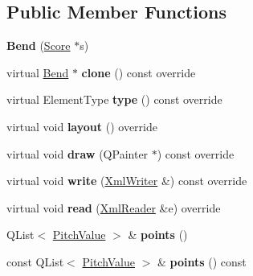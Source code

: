 \subsection*{Public Member Functions}
\begin{DoxyCompactItemize}
\item 
\mbox{\label{class_ms_1_1_bend_a9ec15bddc7c0a0a770fa5e00f4ff7707}} 
{\bfseries Bend} (\hyperlink{class_ms_1_1_score}{Score} $\ast$s)
\item 
\mbox{\label{class_ms_1_1_bend_a25b4b554923466a3712f27a161ebb6c1}} 
virtual \hyperlink{class_ms_1_1_bend}{Bend} $\ast$ {\bfseries clone} () const override
\item 
\mbox{\label{class_ms_1_1_bend_adde4a70787fa300bc199aa8408baca19}} 
virtual Element\+Type {\bfseries type} () const override
\item 
\mbox{\label{class_ms_1_1_bend_ad913356e3ae912de42d59cdb93292503}} 
virtual void {\bfseries layout} () override
\item 
\mbox{\label{class_ms_1_1_bend_a47d7a78e7a5d2e0ae77873a9bb55ff4b}} 
virtual void {\bfseries draw} (Q\+Painter $\ast$) const override
\item 
\mbox{\label{class_ms_1_1_bend_a575845337499312b862927d4b2a289c7}} 
virtual void {\bfseries write} (\hyperlink{class_ms_1_1_xml_writer}{Xml\+Writer} \&) const override
\item 
\mbox{\label{class_ms_1_1_bend_a09ca7d413e418a303f5983dfe3eb0210}} 
virtual void {\bfseries read} (\hyperlink{class_ms_1_1_xml_reader}{Xml\+Reader} \&e) override
\item 
\mbox{\label{class_ms_1_1_bend_a3c2486c1bb206cbda8daa4d2c97d8ccb}} 
Q\+List$<$ \hyperlink{struct_ms_1_1_pitch_value}{Pitch\+Value} $>$ \& {\bfseries points} ()
\item 
\mbox{\label{class_ms_1_1_bend_a52243c3256d1f94341f579a7bf400152}} 
const Q\+List$<$ \hyperlink{struct_ms_1_1_pitch_value}{Pitch\+Value} $>$ \& {\bfseries points} () const
\item 

\end{DoxyCompactItemize}
